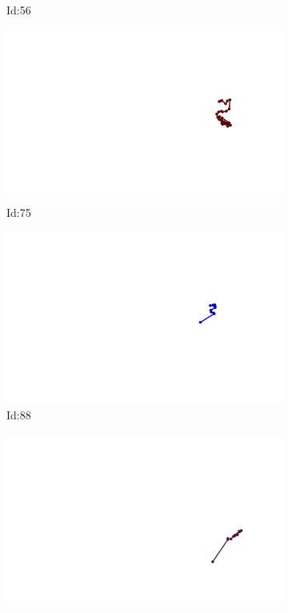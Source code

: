 \documentclass[12pt,twoside]{report}
\begin{document}
\begin{figure}
\begin{subfigure}[b]{0.20\textwidth}
\caption{Id:56}
\end{subfigure}
\begin{subfigure}[b]{0.20\textwidth}
\centering
\includegraphics[width=\textwidth]{../trajectories/75.png}
\caption{Id:75}
\end{subfigure}
\begin{subfigure}[b]{0.20\textwidth}
\centering
\includegraphics[width=\textwidth]{../trajectories/88.png}
\caption{Id:88}
\end{subfigure}
\begin{subfigure}[b]{0.20\textwidth}
\centering
\includegraphics[width=\textwidth]{../trajectories/155.png}

\end{subfigure}
\end{figure}
\end{document}
